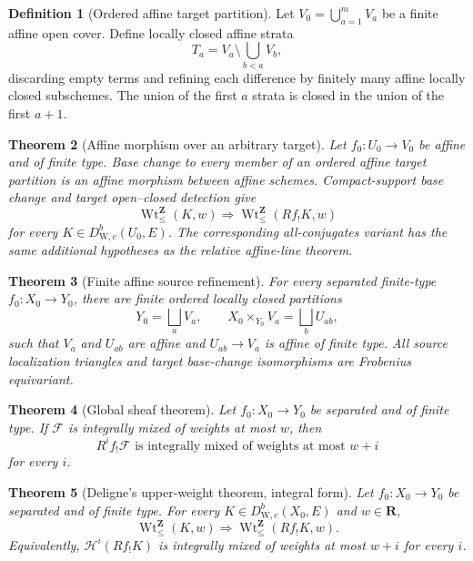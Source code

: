 \documentclass[10pt]{article}
\newtheorem{theorem}{Theorem}[section]
\theoremstyle{definition}
\newtheorem{definition}[theorem]{Definition}
\newcommand{\WeilD}{D^b_{\mathrm W,c}}
\newcommand{\IntWtLe}{\operatorname{Wt}^{\mathbf Z}_{\leq}}
\begin{document}
\begin{definition}[Ordered affine target partition]
Let \(V_0=\bigcup_{a=1}^mV_a\) be a finite affine open cover.  Define
locally closed affine strata
\[
 T_a=V_a\setminus\bigcup_{b<a}V_b,
\]
discarding empty terms and refining each difference by finitely many affine
locally closed subschemes.  The union of the first \(a\) strata is closed in
the union of the first \(a+1\).
\end{definition}

\begin{theorem}[Affine morphism over an arbitrary target]
Let \(f_0:U_0\to V_0\) be affine and of finite type.  Base change to every
member of an ordered affine target partition is an affine morphism between
affine schemes.  Compact-support base change and target open--closed
detection give
\[
                 \IntWtLe(K,w)\Longrightarrow
                 \IntWtLe(Rf_!K,w)
\]
for every \(K\in\WeilD(U_0,E)\).  The corresponding all-conjugates variant
has the same additional hypotheses as the relative affine-line theorem.
\end{theorem}

\begin{theorem}[Finite affine source refinement]
For every separated finite-type
\(f_0:X_0\to Y_0\), there are finite ordered locally closed partitions
\[
 Y_0=\bigsqcup_aV_a,
 \qquad X_0\times_{Y_0}V_a=\bigsqcup_bU_{ab},
\]
such that \(V_a\) and \(U_{ab}\) are affine and
\(U_{ab}\to V_a\) is affine of finite type.  All source localization
triangles and target base-change isomorphisms are Frobenius equivariant.
\end{theorem}

\begin{theorem}[Global sheaf theorem]
Let \(f_0:X_0\to Y_0\) be separated and of finite type.  If
\(\mathcal F\) is integrally mixed of weights at most \(w\), then
\[
 R^if_!\mathcal F
 \text{ is integrally mixed of weights at most }w+i
\]
for every \(i\).
\end{theorem}

\begin{theorem}[Deligne's upper-weight theorem, integral form]
Let \(f_0:X_0\to Y_0\) be separated and of finite type.  For every
\(K\in\WeilD(X_0,E)\) and \(w\in\mathbf R\),
\[
 \boxed{\qquad
 \IntWtLe(K,w)\Longrightarrow\IntWtLe(Rf_!K,w).
 \qquad}
\]
Equivalently, \(\mathcal H^i(Rf_!K)\) is integrally mixed of weights at
most \(w+i\) for every \(i\).
\end{theorem}
\end{document}
